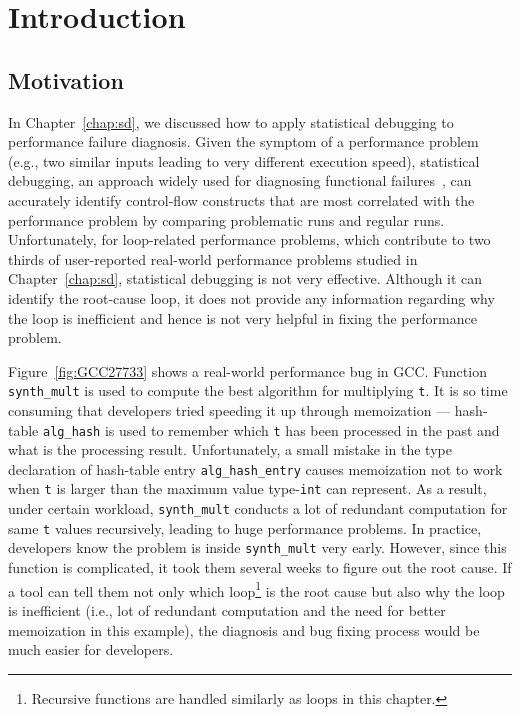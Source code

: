 \section{Introduction}
\label{sec:6_intro}
\subsection{Motivation}

In Chapter~\ref{chap:sd}, 
we discussed how to apply statistical debugging to performance failure diagnosis. 
Given the symptom of 
a performance problem (e.g., two similar inputs leading to very
different execution speed),
statistical debugging, an approach widely used for diagnosing
functional failures~\citep{liblit03,liblit05,tarantula1}, can
accurately identify control-flow constructs that are most correlated with
the performance problem by comparing problematic runs and regular runs.
Unfortunately, for loop-related 
performance problems, which contribute to two thirds of user-reported
real-world performance problems studied in Chapter~\ref{chap:sd},
statistical debugging is not very effective.
Although it can identify the root-cause loop, it does not provide any 
information regarding why the loop is inefficient and hence is not very helpful
in fixing the performance problem.

Figure~\ref{fig:GCC27733} shows a real-world performance bug in GCC. 
Function \texttt{synth\_mult} is used to compute the best algorithm for 
multiplying \texttt{t}. It is so time consuming that developers tried 
speeding it up through memoization ---
hash-table
\texttt{alg\_hash} is used to remember which \texttt{t} has been processed
in the past and what is the processing result. 
Unfortunately, a small mistake in the type declaration of hash-table
entry \texttt{alg\_hash\_entry} causes memoization not to work when \texttt{t}
is larger than the maximum value type-\texttt{int} can represent.
As a result, under certain workload, \texttt{synth\_mult} conducts a lot of
redundant computation for same \texttt{t} values recursively, leading to
huge performance problems.  In practice, developers know the problem is inside
\texttt{synth\_mult} very early. However, since this function is 
complicated, it took them several weeks to figure out the root cause. 
If a tool can tell them not only which loop\footnote{Recursive functions are
handled similarly as loops in this chapter.}
is the root cause but also why the loop is inefficient (i.e., lot of redundant
computation and the need for better memoization in this example), 
the diagnosis and bug fixing
process would be much easier for developers. 

